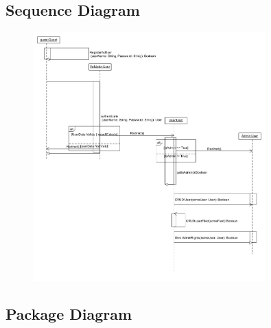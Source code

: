 \subsection{Sequence Diagram}
\begin{figure}[!htbp]
	\includegraphics[width=0.8\textwidth]{User_Management/Sequence_Diagram_User_Management.png}
\end{figure}

\subsection{Package Diagram}

